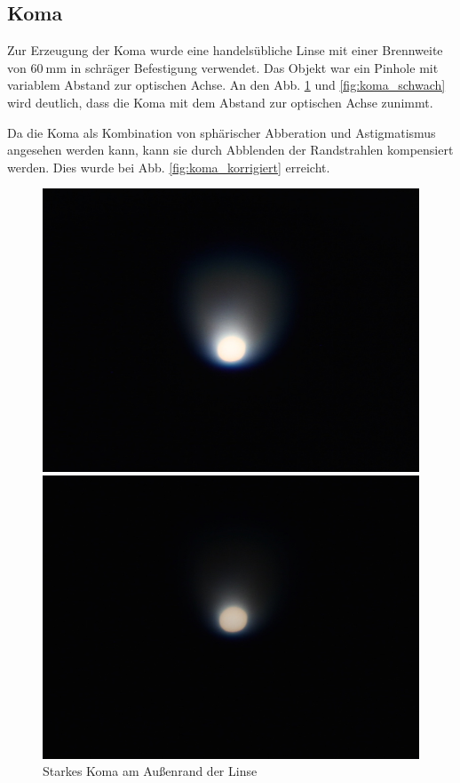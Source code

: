 \subsection{Koma}

Zur Erzeugung der Koma wurde eine handelsübliche Linse mit einer Brennweite von $\SI{60}{\milli\meter}$ in schräger Befestigung verwendet. Das Objekt war ein Pinhole mit variablem Abstand zur optischen Achse. An den Abb. \ref{fig:koma_stark} und \ref{fig:koma_schwach} wird deutlich, dass die Koma mit dem Abstand zur optischen Achse zunimmt. 

Da die Koma als Kombination von sphärischer Abberation und Astigmatismus angesehen werden kann, kann sie durch Abblenden der Randstrahlen kompensiert werden. Dies wurde bei Abb. \ref{fig:koma_korrigiert} erreicht.

\begin{figure}[htb]
	\begin{minipage}[t]{0.32\textwidth}
		\includegraphics[width=\linewidth]{img/Koma/Prakt_Linsenfehler_2015_06_04_097}
		\caption{Starkes Koma am Außenrand der Linse}
		\label{fig:koma_stark}
	\end{minipage}
	\hfill
	\begin{minipage}[t]{0.32\textwidth}
		\includegraphics[width=\linewidth]{img/Koma/Prakt_Linsenfehler_2015_06_04_096}

\end{minipage}
\end{figure}
